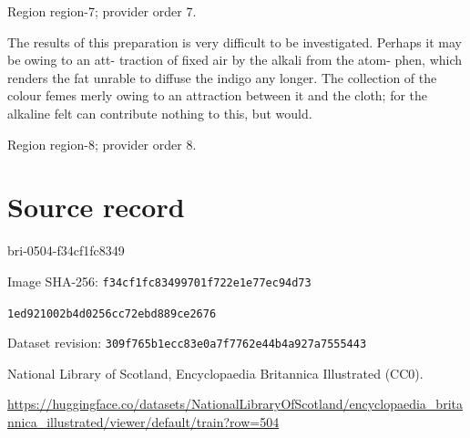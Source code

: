 \documentclass[11pt]{article}
\begin{document}
{\scriptsize\color{gray} Region region-7; provider order 7.\par}
\medskip

The results of this preparation is very difficult to be
investigated. Perhaps it may be owing to an att- traction of fixed air by the alkali from the atom-
phen, which renders the fat unrable to diffuse the
indigo any longer. The collection of the colour femes
merly owing to an attraction between it and the cloth; for the alkaline felt can contribute nothing to this, but
would.
\par

{\scriptsize\color{gray} Region region-8; provider order 8.\par}
\medskip
\newpage\section*{Source record}
bri-0504-f34cf1fc8349\par
Image SHA-256: \texttt{f34cf1fc83499701f722e1e77ec94d73}\par\texttt{1ed921002b4d0256cc72ebd889ce2676}\par
Dataset revision: \texttt{309f765b1ecc83e0a7f7}\texttt{762e44b4a927a7555443}\par
National Library of Scotland, Encyclopaedia Britannica Illustrated (CC0).\par
\url{https://huggingface.co/datasets/NationalLibraryOfScotland/encyclopaedia_britannica_illustrated/viewer/default/train?row=504}
\end{document}
